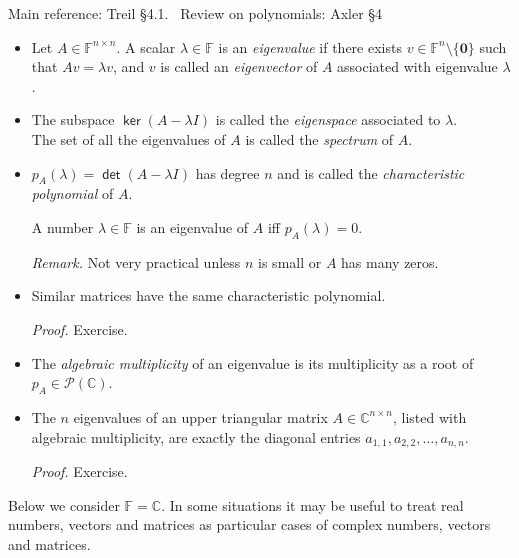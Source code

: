 \documentclass[11pt]{article}
\newcommand{\1}{\mathbf{1}}
\newcommand{\0}{\mathbf{0}}
\newcommand{\C}{\mathbb{C}}
\newcommand{\F}{\mathbb{F}}
\newcommand{\R}{\mathbb{R}}
\newcommand{\cP}{\mathcal{P}}
\DeclareMathOperator{\myker}{\mathsf{ker}}
\DeclareMathOperator{\mydet}{\mathsf{det}}
\begin{document}
Main reference:
Treil
\S4.1.
\
Review on polynomials:
Axler \S4

\begin{itemize}

\item

Let $A \in \F^{n \times n}$.
A scalar $\lambda\in \mathbb{F}$ is an \emph{eigenvalue} if there exists $v\in \F^n \setminus\{\0 \}$ such that $Av=\lambda v$, and $v$ is called an \emph{eigenvector} of $A$ associated with eigenvalue $\lambda$.

\item

The subspace $\myker(A-\lambda I)$ is called the \emph{eigenspace} associated to $\lambda$.
\\
The set of all the eigenvalues of $A$ is called the \emph{spectrum} of $A$.

\item

$p_A(\lambda)=\mydet(A-\lambda I)$ has degree $n$ and is called the \emph{characteristic polynomial} of $A$.

A number $\lambda \in \F$ is an eigenvalue of $A$ iff $p_A(\lambda)=0$.

\emph{Remark.}
Not very practical unless $n$ is small or $A$ has many zeros.

\item

Similar matrices have the same characteristic polynomial.

\emph{Proof.}
Exercise.

\item

The \emph{algebraic multiplicity} of an eigenvalue is its multiplicity as a root of $p_A \in \cP(\C)$.

\item

The $n$ eigenvalues of an upper triangular matrix $A \in \C^{n \times n}$, listed with algebraic multiplicity, are exactly the diagonal entries $a_{1,1},a_{2,2},\dots,a_{n,n}$.

\emph{Proof.}
Exercise.

\end{itemize}

Below we consider $\F = \C$.
In some situations it may be useful to treat real numbers, vectors and matrices as particular cases of complex numbers, vectors and matrices.

\end{document}
